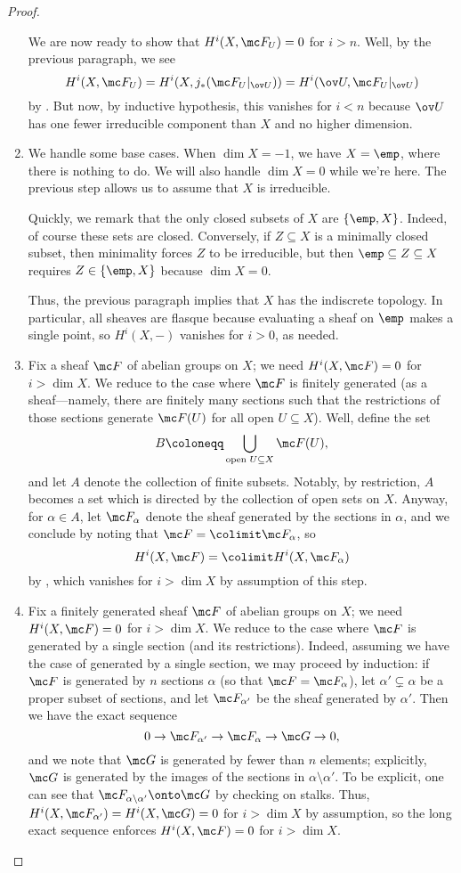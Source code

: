 \documentclass[../notes.tex]{subfiles}
\begin{document}
\begin{proof}
\begin{enumerate}
		We are now ready to show that $H^i(X,\mc F_U)=0$ for $i>n$. Well, by the previous paragraph, we see
		\[H^i(X,\mc F_U)=H^i(X,j_*(\mc F_U|_{\ov U}))=H^i(\ov U,\mc F_U|_{\ov U})\]
		by . But now, by inductive hypothesis, this vanishes for $i<n$ because $\ov U$ has one fewer irreducible component than $X$ and no higher dimension.
		
		\item We handle some base cases. When $\dim X=-1$, we have $X=\emp$, where there is nothing to do. We will also handle $\dim X=0$ while we're here. The previous step allows us to assume that $X$ is irreducible.

		Quickly, we remark that the only closed subsets of $X$ are $\{\emp,X\}$. Indeed, of course these sets are closed. Conversely, if $Z\subseteq X$ is a minimally closed subset, then minimality forces $Z$ to be irreducible, but then $\emp\subseteq Z\subseteq X$ requires $Z\in\{\emp,X\}$ because $\dim X=0$.

		Thus, the previous paragraph implies that $X$ has the indiscrete topology. In particular, all sheaves are flasque because evaluating a sheaf on $\emp$ makes a single point, so $H^i(X,-)$ vanishes for $i>0$, as needed.

		\item Fix a sheaf $\mc F$ of abelian groups on $X$; we need $H^i(X,\mc F)=0$ for $i>\dim X$. We reduce to the case where $\mc F$ is finitely generated (as a sheaf---namely, there are finitely many sections such that the restrictions of those sections generate $\mc F(U)$ for all open $U\subseteq X$). Well, define the set
		\[B\coloneqq\bigcup_{\text{open }U\subseteq X}\mc F(U),\]
		and let $A$ denote the collection of finite subsets. Notably, by restriction, $A$ becomes a set which is directed by the collection of open sets on $X$. Anyway, for $\alpha\in A$, let $\mc F_\alpha$ denote the sheaf generated by the sections in $\alpha$, and we conclude by noting that $\mc F=\colimit\mc F_\alpha$, so
		\[H^i(X,\mc F)=\colimit H^i(X,\mc F_\alpha)\]
		by , which vanishes for $i>\dim X$ by assumption of this step.

		\item Fix a finitely generated sheaf $\mc F$ of abelian groups on $X$; we need $H^i(X,\mc F)=0$ for $i>\dim X$. We reduce to the case where $\mc F$ is generated by a single section (and its restrictions). Indeed, assuming we have the case of generated by a single section, we may proceed by induction: if $\mc F$ is generated by $n$ sections $\alpha$ (so that $\mc F=\mc F_\alpha$), let $\alpha'\subsetneq\alpha$ be a proper subset of sections, and let $\mc F_{\alpha'}$ be the sheaf generated by $\alpha'$. Then we have the exact sequence
		\[0\to\mc F_{\alpha'}\to\mc F_\alpha\to\mc G\to0,\]
		and we note that $\mc G$ is generated by fewer than $n$ elements; explicitly, $\mc G$ is generated by the images of the sections in $\alpha\setminus\alpha'$. To be explicit, one can see that $\mc F_{\alpha\setminus\alpha'}\onto\mc G$ by checking on stalks. Thus, $H^i(X,\mc F_{\alpha'})=H^i(X,\mc G)=0$ for $i>\dim X$ by assumption, so the long exact sequence enforces $H^i(X,\mc F)=0$ for $i>\dim X$.


\end{enumerate}
\end{proof}
\end{document}
